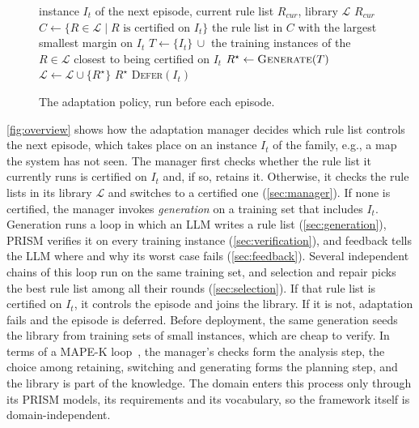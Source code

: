 \begin{figure}[t]
\begin{algorithmic}[1]
\REQUIRE instance $I_t$ of the next episode, current rule list $R_{\mathit{cur}}$, library $\mathcal{L}$
  \RETURN $R_{\mathit{cur}}$
\ENDIF
\STATE $C \gets \{R \in \mathcal{L} \mid R \text{ is certified on } I_t\}$
  \RETURN the rule list in $C$ with the largest smallest margin on $I_t$
\ENDIF
\STATE $T \gets \{I_t\}\, \cup$ the training instances of the $R \in \mathcal{L}$ closest to being certified on $I_t$
\STATE $R^\star \gets \textsc{Generate}(T)$
  \STATE $\mathcal{L} \gets \mathcal{L} \cup \{R^\star\}$
  \RETURN $R^\star$
\ENDIF
\RETURN \textsc{Defer}$(I_t)$
\end{algorithmic}
\caption{The adaptation policy, run before each episode.}
\label{fig:policy}
\end{figure}

\autoref{fig:overview} shows how the adaptation manager decides which rule list controls the next episode, which takes place on an instance $I_t$ of the family, e.g., a map the system has not seen.
The manager first checks whether the rule list it currently runs is certified on $I_t$ and, if so, retains it.
Otherwise, it checks the rule lists in its library $\mathcal{L}$ and switches to a certified one (\autoref{sec:manager}).
If none is certified, the manager invokes \textit{generation} on a training set that includes $I_t$.
Generation runs a loop in which an LLM writes a rule list (\autoref{sec:generation}), PRISM verifies it on every training instance (\autoref{sec:verification}), and feedback tells the LLM where and why its worst case fails (\autoref{sec:feedback}).
Several independent chains of this loop run on the same training set, and selection and repair picks the best rule list among all their rounds (\autoref{sec:selection}).
If that rule list is certified on $I_t$, it controls the episode and joins the library.
If it is not, adaptation fails and the episode is deferred.
Before deployment, the same generation seeds the library from training sets of small instances, which are cheap to verify.
In terms of a MAPE-K loop~\cite{TODO-Kephart2003-MAPE-K}, the manager's checks form the analysis step, the choice among retaining, switching and generating forms the planning step, and the library is part of the knowledge.
The domain enters this process only through its PRISM models, its requirements and its vocabulary, so the framework itself is domain-independent.

